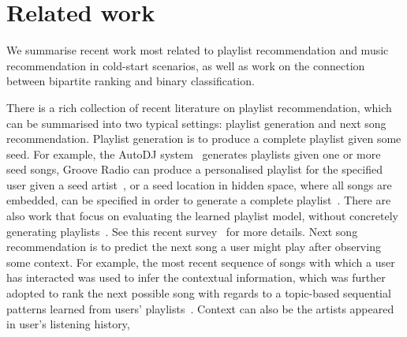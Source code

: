 \section{Related work}

We summarise recent work most related to playlist recommendation and music recommendation in cold-start 
scenarios,
as well as work on the connection between bipartite ranking and binary classification.

There is a rich collection of recent literature on playlist recommendation,
which can be summarised into two typical settings: 
playlist generation and next song recommendation. %
Playlist generation is to produce a complete playlist given some 
seed. %
For example, the AutoDJ system~\cite{platt2002learning} generates playlists given one or more seed songs,
Groove Radio can produce a personalised playlist for the specified user given a seed artist~\cite{ben2017groove},
or a seed location in hidden space, where all songs are embedded,
can be specified in order to generate a complete playlist~\cite{chen2012playlist}.
There are also work that focus on evaluating the learned playlist model,
without concretely generating playlists~\cite{mcfee2011natural,mcfee2012hypergraph}.
See this recent survey~\cite{bonnin2015automated} for more details.
%
Next song recommendation %
is to predict the next song a user might play after observing some context.
For example, the most recent sequence of songs with which a user has interacted was used to
infer the contextual information,
which was further adopted to rank the next possible song
with regards to a topic-based sequential patterns learned from users' playlists~\cite{hariri2012context}.
Context can also be the artists appeared in user's listening history,
